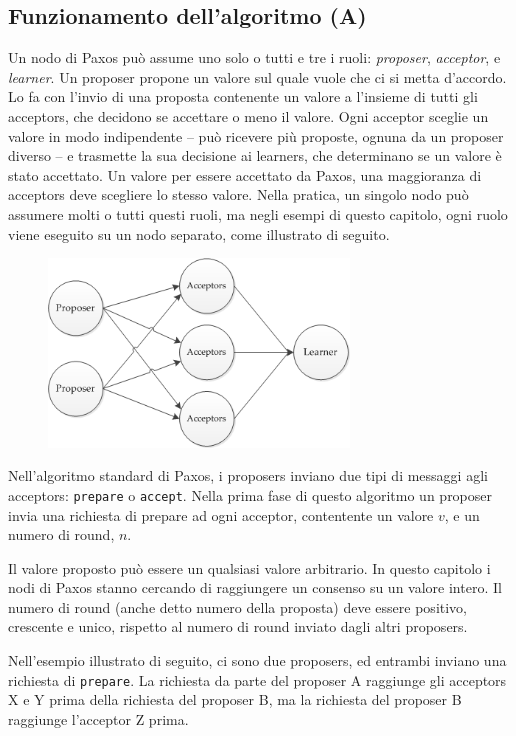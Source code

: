 \subsection{Funzionamento dell'algoritmo (A)}
Un nodo di Paxos può assume uno solo o tutti e tre i ruoli: \textit{proposer}, \textit{acceptor}, e \textit{learner}. Un proposer propone un valore sul quale vuole che ci si metta d’accordo. Lo fa con l’invio di una proposta contenente un valore a l’insieme di tutti gli acceptors, che decidono se accettare o meno il valore. Ogni acceptor sceglie un valore in modo indipendente – può ricevere più proposte, ognuna da un proposer diverso – e trasmette la sua decisione ai learners, che determinano se un valore è stato accettato. Un valore per essere accettato da Paxos, una maggioranza di acceptors deve scegliere lo stesso valore. Nella pratica, un singolo nodo può assumere molti o tutti questi ruoli, ma negli esempi di questo capitolo, ogni ruolo viene eseguito su un nodo separato, come illustrato di seguito.
\clearpage
\begin{figure}[hbt!]
    \centering
    \includegraphics[width=8cm]{./Images/cap2/2.6.png}
    \label{fig:image2.6}
\end{figure}

Nell’algoritmo standard di Paxos, i proposers inviano due tipi di messaggi agli acceptors: \texttt{prepare} o \texttt{accept}. Nella prima fase di questo algoritmo un proposer invia una richiesta di prepare ad ogni acceptor, contentente un valore $v$,  e un numero di round, $n$.

Il valore proposto può essere un qualsiasi valore arbitrario. In questo capitolo i nodi di Paxos stanno cercando di raggiungere un consenso su un valore intero. Il numero di round (anche detto numero della proposta) deve essere positivo, crescente e unico, rispetto al numero di round inviato dagli altri proposers.

Nell’esempio illustrato di seguito, ci sono due proposers, ed entrambi inviano una richiesta di \texttt{prepare}. La richiesta da parte del proposer A raggiunge gli acceptors X e Y prima della richiesta del proposer B, ma la richiesta del proposer B raggiunge l’acceptor Z prima.
\vspace{5mm}

